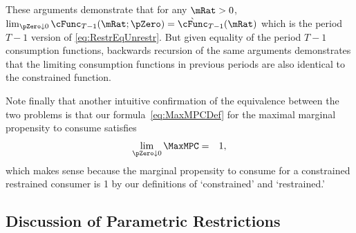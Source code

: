 \documentclass[titlepage]{\econtex}\providecommand{\texname}{BufferStockTheory}%
\begin{document}
These arguments demonstrate that for any $\mRat>0$, $\lim_{\pZero
  \downarrow 0} \cFunc_{T-1}(\mRat;\pZero) =
\grave{\cFunc}_{T-1}(\mRat)$ which is the period $T-1$ version of
\eqref{eq:RestrEqUnrestr}.  But given equality of the period $T-1$
consumption functions, backwards recursion of the same arguments
demonstrates that the limiting consumption functions in previous
periods are also identical to the constrained function.

Note finally that another intuitive confirmation of the equivalence
between the two problems is that our formula~\eqref{eq:MaxMPCDef} for the maximal marginal
propensity to consume satisfies
\begin{eqnarray*}
  \lim_{\pZero \downarrow 0} \MaxMPC & = & 1,
\end{eqnarray*}
which makes sense because the marginal propensity to consume for a
constrained restrained consumer is 1 by our definitions of
`constrained' and `restrained.'


\subsection{Discussion of Parametric Restrictions}\label{sec:discussConvergence}
\end{document}
